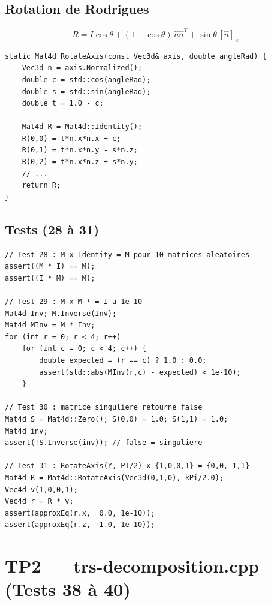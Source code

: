 \documentclass[12pt,a4paper]{report}
\begin{document}
\subsection{Rotation de Rodrigues}

\begin{equation}
    R = I \cos\theta + (1-\cos\theta)\,\hat{n}\hat{n}^T
    + \sin\theta\,[\hat{n}]_\times
\end{equation}

\begin{lstlisting}[caption={Mat4d --- RotateAxis Rodrigues}]
static Mat4d RotateAxis(const Vec3d& axis, double angleRad) {
    Vec3d n = axis.Normalized();
    double c = std::cos(angleRad);
    double s = std::sin(angleRad);
    double t = 1.0 - c;

    Mat4d R = Mat4d::Identity();
    R(0,0) = t*n.x*n.x + c;
    R(0,1) = t*n.x*n.y - s*n.z;
    R(0,2) = t*n.x*n.z + s*n.y;
    // ...
    return R;
}
\end{lstlisting}

\subsection{Tests (28 à 31)}

\begin{lstlisting}[caption={Tests Mat4d}]
// Test 28 : M x Identity = M pour 10 matrices aleatoires
assert((M * I) == M);
assert((I * M) == M);

// Test 29 : M x M⁻¹ = I a 1e-10
Mat4d Inv; M.Inverse(Inv);
Mat4d MInv = M * Inv;
for (int r = 0; r < 4; r++)
    for (int c = 0; c < 4; c++) {
        double expected = (r == c) ? 1.0 : 0.0;
        assert(std::abs(MInv(r,c) - expected) < 1e-10);
    }

// Test 30 : matrice singuliere retourne false
Mat4d S = Mat4d::Zero(); S(0,0) = 1.0; S(1,1) = 1.0;
Mat4d inv;
assert(!S.Inverse(inv)); // false = singuliere

// Test 31 : RotateAxis(Y, PI/2) x {1,0,0,1} = {0,0,-1,1}
Mat4d R = Mat4d::RotateAxis(Vec3d(0,1,0), kPi/2.0);
Vec4d v(1,0,0,1);
Vec4d r = R * v;
assert(approxEq(r.x,  0.0, 1e-10));
assert(approxEq(r.z, -1.0, 1e-10));
\end{lstlisting}

\section{TP2 --- trs-decomposition.cpp (Tests 38 à 40)}
\end{document}
